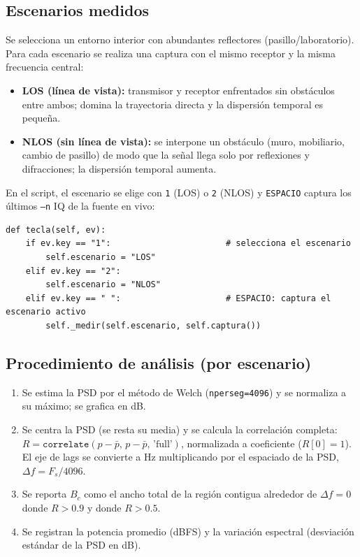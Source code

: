 \documentclass[11pt,a4paper]{article}
\begin{document}
\subsection{Escenarios medidos}

Se selecciona un entorno interior con abundantes reflectores (pasillo/laboratorio). Para cada escenario se realiza una captura con el mismo receptor y la misma frecuencia central:

\begin{itemize}
  \item \textbf{LOS (línea de vista):} transmisor y receptor enfrentados sin obstáculos entre ambos; domina la trayectoria directa y la dispersión temporal es pequeña.
  \item \textbf{NLOS (sin línea de vista):} se interpone un obstáculo (muro, mobiliario, cambio de pasillo) de modo que la señal llega solo por reflexiones y difracciones; la dispersión temporal aumenta.
\end{itemize}

En el script, el escenario se elige con \texttt{1} (LOS) o \texttt{2} (NLOS) y \texttt{ESPACIO} captura los últimos \texttt{--n} IQ de la fuente en vivo:

\begin{Verbatim}[breaklines=true,breakanywhere=true,fontsize=\small]
def tecla(self, ev):
    if ev.key == "1":                       # selecciona el escenario
        self.escenario = "LOS"
    elif ev.key == "2":
        self.escenario = "NLOS"
    elif ev.key == " ":                     # ESPACIO: captura el escenario activo
        self._medir(self.escenario, self.captura())
\end{Verbatim}

\subsection{Procedimiento de análisis (por escenario)}

\begin{enumerate}
  \item Se estima la PSD por el método de Welch (\texttt{nperseg=4096}) y se normaliza a su máximo; se grafica en dB.
  \item Se centra la PSD (se resta su media) y se calcula la correlación completa: $R=\texttt{correlate}(p-\bar{p},\,p-\bar{p},\,\text{'full'})$, normalizada a coeficiente ($R[0]=1$). El eje de lags se convierte a Hz multiplicando por el espaciado de la PSD, $\Delta f=F_s/4096$.
  \item Se reporta $B_c$ como el ancho total de la región contigua alrededor de $\Delta f=0$ donde $R>0.9$ y donde $R>0.5$.
  \item Se registran la potencia promedio (dBFS) y la variación espectral (desviación estándar de la PSD en dB).
\end{enumerate}
\end{document}
